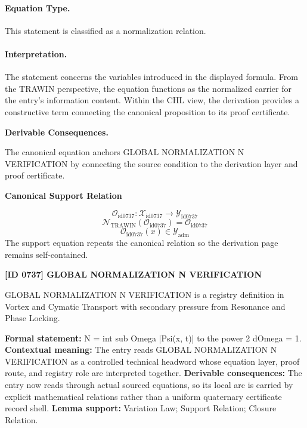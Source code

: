 \paragraph{Equation Type.}
This statement is classified as a normalization relation.

\paragraph{Interpretation.}
The statement concerns the variables introduced in the displayed formula. From the TRAWIN perspective, the equation functions as the normalized carrier for the entry’s information content. Within the CHL view, the derivation provides a constructive term connecting the canonical proposition to its proof certificate.

\par\vspace{0.35em}
\noindent\textbf{Derivable Consequences.}\quad
\begingroup
\footnotesize
\raggedright
The canonical equation anchors GLOBAL NORMALIZATION N VERIFICATION by connecting the source condition to the derivation layer and proof certificate.
\par\endgroup

\noindent\textbf{Canonical Support Relation}\par
\[
\mathcal{O}_{\mathrm{id0737}}:\mathcal{X}_{\mathrm{id0737}}\longrightarrow\mathcal{Y}_{\mathrm{id0737}}
\]
\[
\mathcal{N}_{\mathrm{TRAWIN}}(\mathcal{O}_{\mathrm{id0737}})=\mathcal{O}_{\mathrm{id0737}}
\]
\[
\mathcal{O}_{\mathrm{id0737}}(x)\in\mathcal{Y}_{\mathrm{adm}}
\]
\noindent The support equation repeats the canonical relation so the derivation page remains self-contained.\par

\clearpage
\noindent\textbf{[ID 0737] GLOBAL NORMALIZATION N VERIFICATION}\par
\vspace{0.35em}
\begingroup\small
{}
GLOBAL NORMALIZATION N VERIFICATION is a registry definition in Vortex and Cymatic Transport with secondary pressure from Resonance and Phase Locking.

\begingroup\footnotesize\setlength{\emergencystretch}{3em}\sloppy
\textbf{Formal statement:} N = int sub Omega |Psi(x, t)| to the power 2 dOmega = 1. \textbf{Contextual meaning:} The entry reads GLOBAL NORMALIZATION N VERIFICATION as a controlled technical headword whose equation layer, proof route, and registry role are interpreted together. \textbf{Derivable consequences:} The entry now reads through actual sourced equations, so its local arc is carried by explicit mathematical relations rather than a uniform quaternary certificate record shell. \textbf{Lemma support:} Variation Law; Support Relation; Closure Relation.\par
\endgroup

